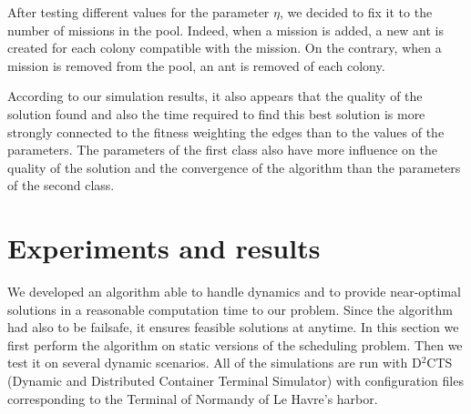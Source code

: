 \documentclass[a4paper,10pt]{article}
\begin{document}
After testing different values for the parameter $\eta$, we decided to fix it to the number of missions in the pool. Indeed, when a mission is added, a new ant is created for each colony compatible with the mission. On the contrary, when a mission is removed from the pool, an ant is removed of each colony.

According to our simulation results, it also appears that the quality of the solution found and also the time required to find this best solution is more strongly connected to the fitness weighting the edges than to the values of the parameters. The parameters of the first class also have more influence on the quality of the solution and the convergence of the algorithm than the parameters of the second class.

\section{Experiments and results}
   We developed an algorithm able to handle dynamics and to provide near-optimal solutions in a reasonable computation time to our problem. Since the algorithm had also to be failsafe, it ensures feasible solutions at anytime. In this section we first perform the algorithm on static versions of the scheduling problem. Then we test it on several dynamic scenarios.
   All of the simulations are run with D$^2$CTS (Dynamic and Distributed Container Terminal Simulator)\cite{Lesauvage2011} with configuration files corresponding to the Terminal of Normandy of Le Havre's harbor.
\end{document}

